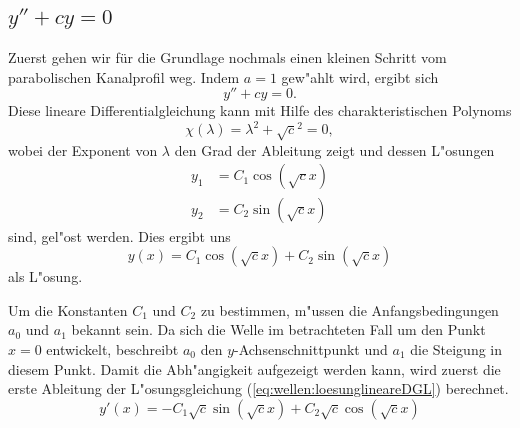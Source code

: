 \subsection{\texorpdfstring{$y''+cy = 0$}{y''+cy = 0}}
Zuerst gehen wir für die Grundlage nochmals einen kleinen Schritt vom 
parabolischen Kanalprofil weg. Indem $a=1$ gew"ahlt wird, 
ergibt sich
\begin{equation}
	y''+ cy = 0.
	\label{eq:wellen:lineareDGL}
\end{equation}
Diese lineare Differentialgleichung kann mit Hilfe des charakteristischen 
Polynoms
\begin{equation*}
	\chi(\lambda) = \lambda^2+\sqrt{c}^2 = 0,
\end{equation*}
wobei der Exponent von $\lambda$ den Grad der Ableitung zeigt und dessen 
L"osungen
\begin{equation*}
	\begin{split}
		y_1 &= C_1\cos(\sqrt{c} x) \\
		y_2 &= C_2\sin(\sqrt{c} x)
	\end{split}
\end{equation*}
sind, gel"ost werden. Dies ergibt uns
\begin{equation}
	y(x) = C_1 \cos(\sqrt{c}x) + C_2 \sin(\sqrt{c}x)
	\label{eq:wellen:loesunglineareDGL}
\end{equation}
als L"osung.

Um die Konstanten $C_1$ und $C_2$ zu bestimmen, m"ussen die Anfangsbedingungen 
$a_0$ und $a_1$ bekannt sein. Da sich die Welle im betrachteten Fall um den 
Punkt $x=0$ entwickelt, beschreibt $a_0$ den $y$-Achsenschnittpunkt und $a_1$ die 
Steigung in diesem Punkt. Damit die Abh"angigkeit aufgezeigt werden kann, wird 
zuerst die erste Ableitung der L"osungsgleichung 
(\ref{eq:wellen:loesunglineareDGL}) berechnet.
\begin{equation*}
	y'(x)=-C_1 \sqrt{c} \sin(\sqrt{c}x) + C_2 \sqrt{c} \cos(\sqrt{c}x)
\end{equation*}

